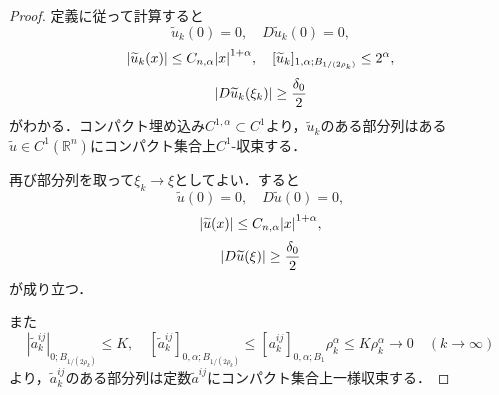 \documentclass[a4paper]{ltjsarticle}
\newcommand{\Rset}{\mathbb{R}}
\newcommand{\1}{\mathbbm{1}}
\numberwithin{equation}{section}
\theoremstyle{definition}
\begin{document}
\begin{proof}
    定義に従って計算すると
    \begin{equation}
        \widetilde{u}_k(0)=0,\quad D\widetilde{u}_k(0)=0,
    \end{equation}
    \begin{equation}
        \abs{\widetilde{u}_k(x)}\leq C_{n,\alpha}\abs{x}^{1+\alpha},\quad [\widetilde{u}_k]_{1,\alpha;B_{1/(2\rho_k)}}\leq 2^{\alpha},
    \end{equation}
    \begin{equation}
        \abs{D\widetilde{u}_k(\xi_k)}\geq \frac{\delta_0}{2}
    \end{equation}
    がわかる．コンパクト埋め込み$C^{1,\alpha}\subset C^{1}$より，$\widetilde{u}_k$のある部分列はある$\widetilde{u}\in C^1(\Rset^n)$にコンパクト集合上$C^1$-収束する．

    再び部分列を取って$\xi_k\to\xi$としてよい．すると
    \begin{equation}
        \widetilde{u}(0)=0,\quad D\widetilde{u}(0)=0,
    \end{equation}
    \begin{equation}
        |\widetilde{u}(x)|\leq C_{n,\alpha}\abs{x}^{1+\alpha},
    \end{equation}
    \begin{equation}
        \abs{D\widetilde{u}(\xi)}\geq \frac{\delta_0}{2}
    \end{equation}
    が成り立つ．

    また
    \begin{equation}
        |\widetilde{a}^{ij}_k|_{0;B_{1/(2\rho_k)}}\leq K,\quad [\widetilde{a}^{ij}_k]_{0,\alpha;B_{1/(2\rho_k)}}\leq [a^{ij}_k]_{0,\alpha;B_1}\rho_k^\alpha\leq K\rho_k^\alpha\to0\quad (k\to\infty) 
    \end{equation}
    より，$\widetilde{a}^{ij}_k$のある部分列は定数$\widetilde{a}^{ij}$にコンパクト集合上一様収束する．


\end{proof}
\end{document}
